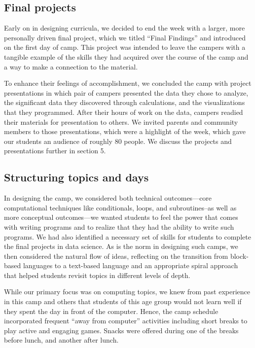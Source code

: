 \subsection{Final projects}

Early on in designing curricula, we decided to end the week with a
larger, more personally driven final project, which we titled ``Final
Findings'' and introduced on the first day of camp.  This project
was intended to leave the campers with a tangible example of the
skills they had acquired over the course of the camp and a way to
make a connection to the material.

To enhance their feelings of accomplishment, we concluded the camp
with project presentations in which pair of campers presented the
data they chose to analyze, the significant data they discovered
through calculations, and the visualizations that they programmed.
After their hours of work on the data, campers readied their materials
for presentation to others.  We invited parents and community members
to those presentations, which were a highlight of the week, which
gave our students an audience of roughly 80 people.  We discuss the
projects and presentations further in section 5.

\subsection{Structuring topics and days}

In designing the camp, we considered both technical outcomes---core
computational techniques like conditionals, loops, and subroutines--as
well as more conceptual outcomes---we wanted students to feel the
power that comes with writing programs and to realize that they had
the ability to write such programs.  We had also identified a
necessary set of skills for students to complete the final projects
in data science.  As is the norm in designing such camps, we then
considered the natural flow of ideas, reflecting on the transition
from block-based languages to a text-based language and an appropriate
spiral approach that helped students revisit topics in different
levels of depth.

While our primary focus was on computing topics, we knew from past
experience in this camp and others that students of this age group
would not learn well if they spent the day in front of the computer.
Hence, the camp schedule incorporated frequent ``away from computer''
activities including short breaks to play active and engaging games.
Snacks were offered during one of the breaks before lunch, and
another after lunch.


